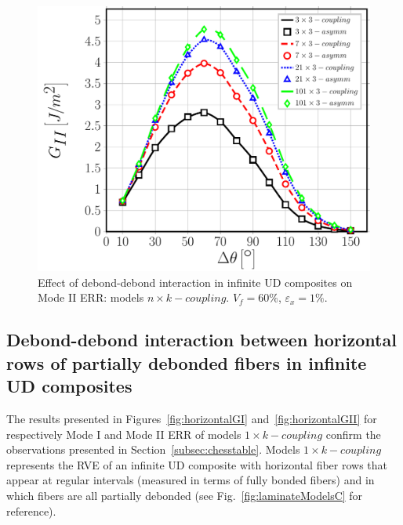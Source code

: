 \documentclass[smallextended]{svjour3}       %
\begin{document}
\begin{figure}[!h]
\centering
\includegraphics[width=\textwidth]{nxk-coupling-vf60-GII.pdf}
\caption{Effect of debond-debond interaction in infinite UD composites on Mode II ERR: models $n\times k-coupling$. $V_{f}=60\%$, $\varepsilon_{x}=1\%$.}\label{fig:debonddebondGII}
\end{figure}

\subsection{Debond-debond interaction between horizontal rows of partially debonded fibers in infinite UD composites}\label{subsec:horizontal}

The results presented in Figures~\ref{fig:horizontalGI} and~\ref{fig:horizontalGII} for respectively Mode I and Mode II ERR of models $1\times k-coupling$ confirm the observations presented in Section~\ref{subsec:chesstable}. Models $1\times k-coupling$ represents the RVE of an infinite UD composite with horizontal fiber rows that appear at regular intervals (measured in terms of fully bonded fibers) and in which fibers are all partially debonded (see Fig.~\ref{fig:laminateModelsC} for reference).
\end{document}
